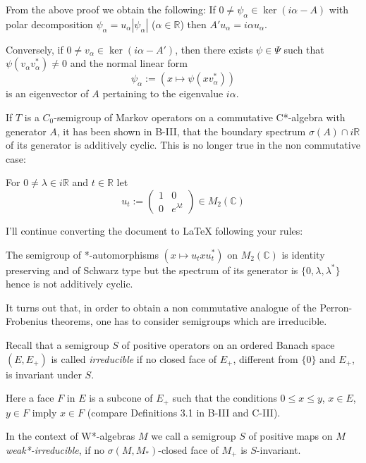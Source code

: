 \begin{remark}\label{rem:d3-1-9}
From the above proof we obtain the following: If $0 \neq \psi_{\alpha} \in \ker(i\alpha - A)$ with polar decomposition $\psi_{\alpha} = u_{\alpha}|\psi_{\alpha}|$ ($\alpha \in \mathbb{R}$) then $A'u_{\alpha} = i\alpha u_{\alpha}$.

Conversely, if $0 \neq v_{\alpha} \in \ker(i\alpha - A')$, then there exists $\psi \in \Psi$ such that $\psi(v_{\alpha}v_{\alpha}^{*}) \neq 0$ and the normal linear form
\[
\psi_{\alpha} := (x \mapsto \psi(xv_{\alpha}^{*}))
\]
is an eigenvector of $A$ pertaining to the eigenvalue $i\alpha$.
\end{remark}

If $T$ is a $C_{0}$-semigroup of Markov operators on a commutative C*-algebra with generator $A$, it has been shown in B-III, that the boundary spectrum $\sigma(A) \cap i\mathbb{R}$ of its generator is additively cyclic.
This is no longer true in the non commutative case:

For $0 \neq \lambda \in i\mathbb{R}$ and $t \in \mathbb{R}$ let
\[
u_{t} := \begin{pmatrix} 1 & 0 \\ 0 & e^{\lambda t} \end{pmatrix} \in M_{2}(\mathbb{C})
\]


I'll continue converting the document to LaTeX following your rules:

The semigroup of *-automorphisms $(x \mapsto u_{t}xu_{t}^{*})$ on $M_{2}(\mathbb{C})$ is identity preserving and of Schwarz type but the spectrum of its generator is $\{0, \lambda, \lambda^{*}\}$ hence is not additively cyclic.

It turns out that, in order to obtain a non commutative analogue of the Perron-Frobenius theorems, one has to consider semigroups which are irreducible.

Recall that a semigroup $S$ of positive operators on an ordered Banach space $(E,E_{+})$ is called \emph{irreducible} if no closed face of $E_{+}$, different from $\{0\}$ and $E_{+}$, is invariant under $S$.

Here a face $F$ in $E$ is a subcone of $E_{+}$ such that the conditions $0 \leq x \leq y$, $x \in E$, $y \in F$ imply $x \in F$ (compare Definitions 3.1 in B-III and C-III).

In the context of W*-algebras $M$ we call a semigroup $S$ of positive maps on $M$ \emph{weak*-irreducible}, if no $\sigma(M,M_{*})$-closed face of $M_{+}$ is $S$-invariant.

